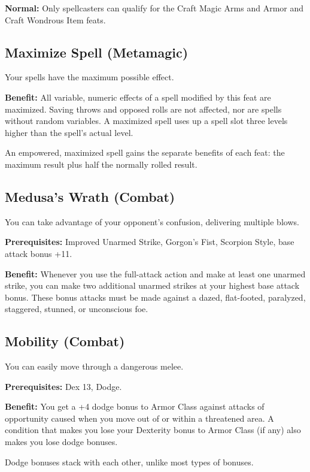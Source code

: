 \textbf{Normal:} Only spellcasters can qualify for the Craft Magic Arms and Armor and Craft Wondrous Item feats.
				
\subsection{Maximize Spell (Metamagic)}

				
Your spells have the maximum possible effect.
				
\textbf{Benefit:} All variable, numeric effects of a spell modified by this feat are maximized. Saving throws and opposed rolls are not affected, nor are spells without random variables. A maximized spell uses up a spell slot three levels higher than the spell's actual level.

An empowered, maximized spell gains the separate benefits of each feat: the maximum result plus half the normally rolled result.
				
\subsection{Medusa's Wrath (Combat)}

				
You can take advantage of your opponent's confusion, delivering multiple blows.
				
\textbf{Prerequisites:} Improved Unarmed Strike, Gorgon's Fist, Scorpion Style, base attack bonus +11.
				
\textbf{Benefit:} Whenever you use the full-attack action and make at least one unarmed strike, you can make two additional unarmed strikes at your highest base attack bonus. These bonus attacks must be made against a dazed, flat-footed, paralyzed, staggered, stunned, or unconscious foe.
				
\subsection{Mobility (Combat)}

				
You can easily move through a dangerous melee.
				
\textbf{Prerequisites:} Dex 13, Dodge.
				
\textbf{Benefit:} You get a +4 dodge bonus to Armor Class against attacks of opportunity caused when you move out of or within a threatened area. A condition that makes you lose your Dexterity bonus to Armor Class (if any) also makes you lose dodge bonuses.

Dodge bonuses stack with each other, unlike most types of bonuses.
				
